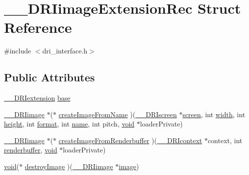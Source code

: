 \hypertarget{struct_____d_r_iimage_extension_rec}{}\section{\+\_\+\+\_\+\+D\+R\+Iimage\+Extension\+Rec Struct Reference}
\label{struct_____d_r_iimage_extension_rec}


{\ttfamily \#include $<$dri\+\_\+interface.\+h$>$}

\subsection*{Public Attributes}
\begin{DoxyCompactItemize}
\item 
\hyperlink{dri__interface_8h_a4e0a61c8ece00d2b2c6792a9a1b55385}{\+\_\+\+\_\+\+D\+R\+Iextension} \hyperlink{struct_____d_r_iimage_extension_rec_a0705eddcc3909eb2c216213a4ba74040}{base}
\item 
\hyperlink{dri__interface_8h_a37e0407153595dc88fe5d25127645cf1}{\+\_\+\+\_\+\+D\+R\+Iimage} $\ast$($\ast$ \hyperlink{struct_____d_r_iimage_extension_rec_ae37aa83d91973f4d86e3bb6a34d1ca7b}{create\+Image\+From\+Name} )(\hyperlink{dri__interface_8h_a9961b01d421ee1fd6ed3c05acc9ca561}{\+\_\+\+\_\+\+D\+R\+Iscreen} $\ast$\hyperlink{cad_8h_ae04e09e4e3831bfc1632c509ae37dcec}{screen}, int \hyperlink{gl_8h_a9a82cf3caff84cabc4598e2619faac17}{width}, int \hyperlink{gl_8h_aa352f2804b9902ac30769c00dde75d5f}{height}, int \hyperlink{gl_8h_a71a65ffd977afe9c3fef116a5bc9ee27}{format}, int \hyperlink{glcorearb_8h_aaced7cfc21e7d37775d6921bb8177239}{name}, int pitch, \hyperlink{_s_d_l__opengles2__gl2ext_8h_ae5d8fa23ad07c48bb609509eae494c95}{void} $\ast$loader\+Private)
\item 
\hyperlink{dri__interface_8h_a37e0407153595dc88fe5d25127645cf1}{\+\_\+\+\_\+\+D\+R\+Iimage} $\ast$($\ast$ \hyperlink{struct_____d_r_iimage_extension_rec_a4e84cfb8503d08dc5219fa7f1a6edbb6}{create\+Image\+From\+Renderbuffer} )(\hyperlink{dri__interface_8h_a3fd295cba82b5a3d79f1ee7e12bfb908}{\+\_\+\+\_\+\+D\+R\+Icontext} $\ast$context, int \hyperlink{glcorearb_8h_a2de59ce19521dddd661a02a95abc2764}{renderbuffer}, \hyperlink{_s_d_l__opengles2__gl2ext_8h_ae5d8fa23ad07c48bb609509eae494c95}{void} $\ast$loader\+Private)
\item 
\hyperlink{_s_d_l__opengles2__gl2ext_8h_ae5d8fa23ad07c48bb609509eae494c95}{void}($\ast$ \hyperlink{struct_____d_r_iimage_extension_rec_ac97ca702de4f8bf00393ebe2c5ccbc5b}{destroy\+Image} )(\hyperlink{dri__interface_8h_a37e0407153595dc88fe5d25127645cf1}{\+\_\+\+\_\+\+D\+R\+Iimage} $\ast$\hyperlink{gl_8h_a0a221b005894579fea3b9eb7bfc2ee71}{image})

\end{DoxyCompactItemize}
